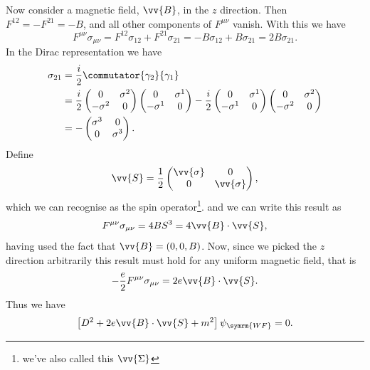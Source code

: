 \documentclass[fleqn]{NotesClass}
\newcommand{\covariantDerivative}{D}
\begin{document}
    Now consider a magnetic field, \(\vv{B}\), in the \(z\) direction.
    Then \(F^{12} = -F^{21} = -B\), and all other components of \(F^{\mu\nu}\) vanish.
    With this we have
    \begin{equation}
        F^{\mu\nu}\sigma_{\mu\nu} = F^{12}\sigma_{12} + F^{21}\sigma_{21} = -B\sigma_{12} + B\sigma_{21} = 2B\sigma_{21}.
    \end{equation}
    In the Dirac representation we have
    \begin{align}
        \sigma_{21} &= \frac{i}{2}\commutator{\gamma_2}{\gamma_1}\\
        &= \frac{i}{2}
        \begin{pmatrix}
            0 & \sigma^2\\
            -\sigma^2 & 0
        \end{pmatrix}
        \begin{pmatrix}
            0 & \sigma^1\\
            -\sigma^1 & 0
        \end{pmatrix}
        - \frac{i}{2}
        \begin{pmatrix}
            0 & \sigma^1\\
            -\sigma^1 & 0
        \end{pmatrix}
        \begin{pmatrix}
            0 & \sigma^2\\
            -\sigma^2 & 0
        \end{pmatrix}
        \\
        &= 
        -
        \begin{pmatrix}
            \sigma^3 & 0\\
            0 & \sigma^3
        \end{pmatrix}
        .
    \end{align}
    Define
    \begin{equation}
        \vv{S} = \frac{1}{2}
        \begin{pmatrix}
            \vv{\sigma} & 0\\
            0 & \vv{\sigma}
        \end{pmatrix}
        ,
    \end{equation}
    which we can recognise as the spin operator\footnote{we've also called this \(\vv{\Sigma}\)}.
    and we can write this result as
    \begin{equation}
        F^{\mu\nu}\sigma_{\mu\nu} = 4BS^3 = 4 \vv{B} \cdot \vv{S},
    \end{equation}
    having used the fact that \(\vv{B} = (0, 0, B)\).
    Now, since we picked the \(z\) direction arbitrarily this result must hold for any uniform magnetic field, that is
    \begin{equation}
        -\frac{e}{2}F^{\mu\nu}\sigma_{\mu\nu} = 2e\vv{B} \cdot \vv{S}.
    \end{equation}
    Thus we have
    \begin{equation}
        \left[ \covariantDerivative^2 + 2e\vv{B} \cdot \vv{S} + m^2 \right] \psi_{\symrm{WF}} = 0.
    \end{equation}
    
\end{document}
